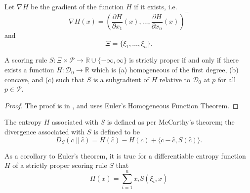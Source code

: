 \documentclass[12pt]{article}
\begin{document}
Let $\nabla{}H$ be the gradient of the function $H$ if it exists, i.e.
\begin{equation}
  \label{eq:ailaekoi}
  \nabla{}H(x)=\left(\frac{\partial{}H}{\partial{}x_{1}}(x),{\ldots},\frac{\partial{}H}{\partial{}x_{n}}(x)\right)^{\intercal}
\end{equation}
and
\begin{equation}
  \label{eq:ahphaete}
  \Xi=\{\xi_{1},{\ldots},\xi_{n}\}.
\end{equation}

\begin{theorem} 
  \label{thm:lahpoodu}
  A scoring rule
  $S:\Xi\times\mathcal{P}\rightarrow\mathbb{R}\cup\{-\infty,\infty\}$
  is strictly proper if and only if there exists a function
  $H:\mathcal{D}_{0}\rightarrow\mathbb{R}$ which is (a) homogeneous of
  the first degree, (b) concave, and (c) such that $S$ is a
  subgradient of $H$ relative to $\mathcal{D}_{0}$ at $p$ for all
  $p\in\mathcal{P}$.
\end{theorem}
\begin{proof}
  \label{prf:wadahsai}
The proof is in , and uses
Euler's Homogeneous Function Theorem.
\end{proof}


\begin{definition}
  \label{def:logahpoh}
  The entropy $H$ associated with $S$ is defined as per McCarthy's
  theorem; the divergence associated with $S$ is defined to be
\begin{equation}
  \label{eq:reeshooz}
  D_{S}(c\|\hat{c})=H(\hat{c})-H(c)+\langle{}c-\hat{c},S(\hat{c})\rangle.
\end{equation}
\end{definition}

\begin{corollary}
  \label{cor:quiphaef}
  As a corollary to Euler's theorem, it is true for a differentiable
  entropy function $H$ of a strictly proper scoring rule $S$ that
  \begin{equation}
    \label{eq:ciejahng}
    H(x)=\sum_{i=1}^{n}x_{i}S(\xi_{i},x)
  \end{equation}
\end{corollary}
\end{document}
